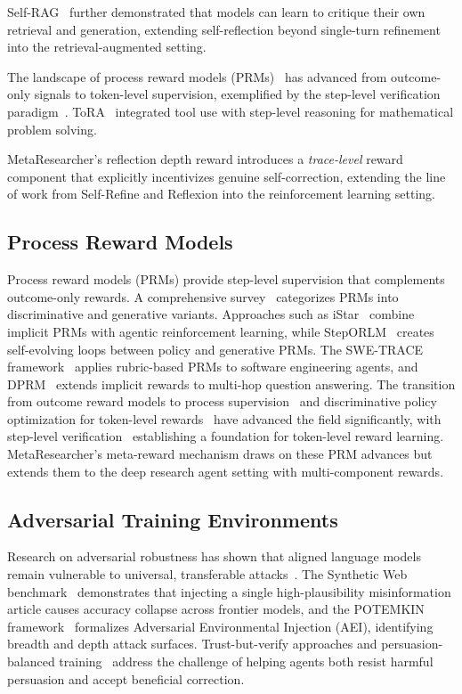 \documentclass[notspecified,article,accept,pdftex,moreauthors]{Definitions/mdpi}
\begin{document}
Self-RAG~\cite{b9} further demonstrated that models can learn to critique their own retrieval and generation, extending self-reflection beyond single-turn refinement into the retrieval-augmented setting.

The landscape of process reward models (PRMs)~\cite{b32} has advanced from outcome-only signals to token-level supervision, exemplified by the step-level verification paradigm~\cite{b8}. ToRA~\cite{b53} integrated tool use with step-level reasoning for mathematical problem solving.

MetaResearcher's reflection depth reward introduces a \textit{trace-level} reward component that explicitly incentivizes genuine self-correction, extending the line of work from Self-Refine and Reflexion into the reinforcement learning setting.

\subsection{Process Reward Models}
Process reward models (PRMs) provide step-level supervision that complements outcome-only rewards. A comprehensive survey~\cite{b32} categorizes PRMs into discriminative and generative variants. Approaches such as iStar~\cite{b33} combine implicit PRMs with agentic reinforcement learning, while StepORLM~\cite{b34} creates self-evolving loops between policy and generative PRMs. The SWE-TRACE framework~\cite{b35} applies rubric-based PRMs to software engineering agents, and DPRM~\cite{b36} extends implicit rewards to multi-hop question answering. The transition from outcome reward models to process supervision~\cite{b38} and discriminative policy optimization for token-level rewards~\cite{b37} have advanced the field significantly, with step-level verification~\cite{b8} establishing a foundation for token-level reward learning. MetaResearcher's meta-reward mechanism draws on these PRM advances but extends them to the deep research agent setting with multi-component rewards.

\subsection{Adversarial Training Environments}
Research on adversarial robustness has shown that aligned language models remain vulnerable to universal, transferable attacks~\cite{b27}. The Synthetic Web benchmark~\cite{b39} demonstrates that injecting a single high-plausibility misinformation article causes accuracy collapse across frontier models, and the POTEMKIN framework~\cite{b40} formalizes Adversarial Environmental Injection (AEI), identifying breadth and depth attack surfaces. Trust-but-verify approaches and persuasion-balanced training~\cite{b45} address the challenge of helping agents both resist harmful persuasion and accept beneficial correction.
\end{document}
